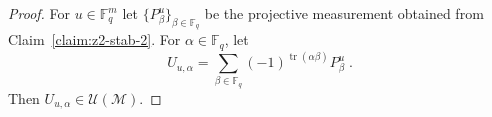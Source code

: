\documentclass[11pt]{article}
\theoremstyle{definition}
\DeclareMathOperator*{\Expectation}{\mathbb{E}}
\newcommand{\Es}[1]{\Expectation_{#1}}
\newcommand{\F}{\ensuremath{\mathbb{F}}}
\newcommand{\mM}{\ensuremath{\mathcal{M}}}
\newcommand{\mU}{\ensuremath{\mathcal{U}}}
\newcommand{\eps}{\varepsilon}
\DeclareMathOperator{\tr}{tr}
\begin{document}
\begin{proof}
For $u\in \F_q^m$ let $\{P^{u}_\beta\}_{\beta \in \F_q}$ be the projective measurement obtained from Claim~\ref{claim:z2-stab-2}. For $\alpha\in \F_q$, let  
\[ U_{u,\alpha} = \sum_{\beta\in\F_q} (-1)^{\tr(\alpha\beta)} P^u_{\beta}\;.\]
Then $U_{u,\alpha} \in \mU(\mM)$. 



\end{proof}
\end{document}
